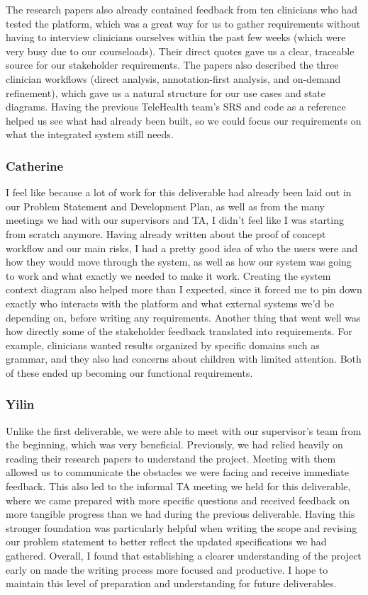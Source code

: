\documentclass[12pt]{article}
\begin{document}
The research papers also already contained feedback from ten clinicians who had tested the platform, which was a great way for us to gather requirements without having to interview clinicians ourselves within the past few weeks (which were very busy due to our courseloads). Their direct quotes gave us a clear, traceable source for our stakeholder requirements. The papers also described the three clinician workflows (direct analysis, annotation-first analysis, and on-demand refinement), which gave us a natural structure for our use cases and state diagrams. Having the previous TeleHealth team’s SRS and code as a reference helped us see what had already been built, so we could focus our requirements on what the integrated system still needs.

\subsubsection*{Catherine}
I feel like because a lot of work for this deliverable had already been laid out in our Problem
Statement and Development Plan, as well as from the many meetings we had with our
supervisors and TA, I didn't feel like I was starting from scratch anymore.
Having already written about the proof of concept workflow and our main risks, I had a
pretty good idea of who the users were and how they would move through the system, as well
as how our system was going to work and what exactly we needed to make it work.
Creating the system context diagram also helped more than I expected, since it forced 
me to pin down exactly who interacts with the platform
and what external systems we'd be depending on, before writing any requirements. Another
thing that went well was how directly some of the stakeholder feedback translated into
requirements. For example, clinicians wanted results organized by specific domains such as grammar,
and they also had concerns about children with limited attention. Both of these ended up
becoming our functional requirements.

\subsubsection*{Yilin}
Unlike the first deliverable, we were able to meet with our supervisor’s team from the beginning, which was very beneficial. Previously, we had relied heavily on reading their research papers to understand the project. Meeting with them allowed us to communicate the obstacles we were facing and receive immediate feedback. This also led to the informal TA meeting we held for this deliverable, where we came prepared with more specific questions and received feedback on more tangible progress than we had during the previous deliverable. Having this stronger foundation was particularly helpful when writing the scope and revising our problem statement to better reflect the updated specifications we had gathered. Overall, I found that establishing a clearer understanding of the project early on made the writing process more focused and productive. I hope to maintain this level of preparation and understanding for future deliverables.
\end{document}

